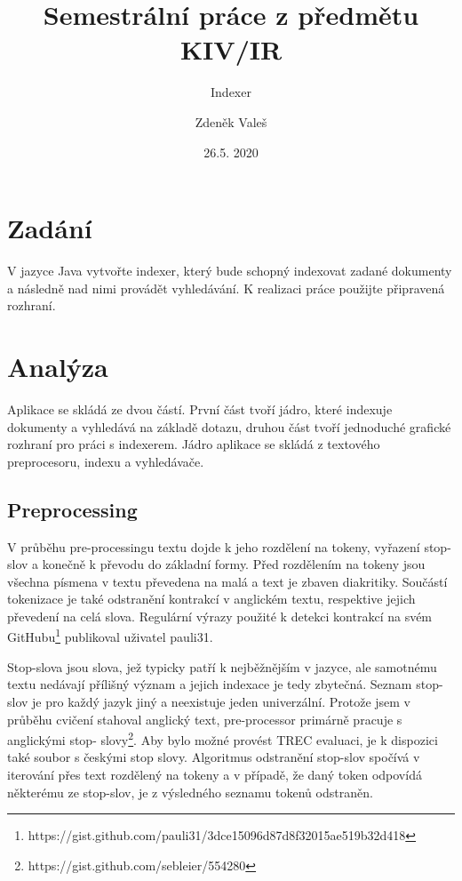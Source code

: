 \documentclass[11pt,a4paper]{scrartcl}
\begin{document}
	\title{Semestrální práce z předmětu KIV/IR}
	\subtitle{Indexer}
	\author{Zdeněk Valeš}
	\date{26.5. 2020}
	\maketitle
	\newpage
	
	\section{Zadání}
	V jazyce Java vytvořte indexer, který bude schopný indexovat zadané dokumenty a následně nad nimi provádět vyhledávání. K realizaci práce použijte připravená rozhraní.
	
	\section{Analýza}
	Aplikace se skládá ze dvou částí. První část tvoří jádro, které indexuje dokumenty a vyhledává na základě dotazu, druhou část tvoří jednoduché grafické rozhraní pro práci s indexerem. Jádro aplikace se skládá z textového preprocesoru, indexu a vyhledávače.
	
	\subsection{Preprocessing}
	
	V průběhu pre-processingu textu dojde k jeho rozdělení na tokeny, vyřazení stop-slov a konečně k převodu do základní formy. Před rozdělením na tokeny jsou všechna písmena v textu převedena na malá a text je zbaven diakritiky. Součástí tokenizace je také odstranění kontrakcí v anglickém textu, respektive jejich převedení na celá slova. Regulární výrazy použité k detekci kontrakcí na svém GitHubu\footnote{https://gist.github.com/pauli31/3dce15096d87d8f32015ae519b32d418} publikoval uživatel pauli31. 
	
	Stop-slova jsou slova, jež typicky patří k nejběžnějším v jazyce, ale samotnému textu nedávají přílišný význam a jejich indexace je tedy zbytečná. Seznam stop-slov je pro každý jazyk jiný a neexistuje jeden univerzální. Protože jsem v průběhu cvičení stahoval anglický text, pre-processor primárně pracuje s anglickými stop- slovy\footnote{https://gist.github.com/sebleier/554280}. Aby bylo možné provést TREC evaluaci, je k dispozici také soubor s českými stop slovy. Algoritmus odstranění stop-slov spočívá v iterování přes text rozdělený na tokeny a v případě, že daný token odpovídá některému ze stop-slov, je z výsledného seznamu tokenů odstraněn.
	
\end{document}
